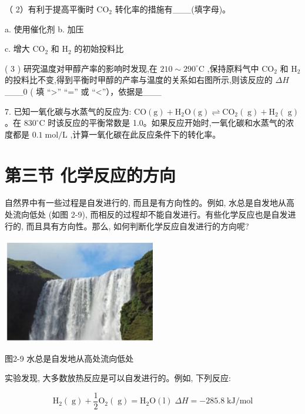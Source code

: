 \documentclass[10pt]{article}
\begin{document}
（ 2）有利于提高平衡时 \({\mathrm{{CO}}}_{2}\) 转化率的措施有\_\_\_(填字母)。

a. 使用催化剂 b. 加压

c. 增大 \({\mathrm{{CO}}}_{2}\) 和 \({\mathrm{H}}_{2}\) 的初始投料比

( 3 ) 研究温度对甲醇产率的影响时发现,在 \({210} \sim {290}^{ \circ }\mathrm{C}\) ,保持原料气中 \({\mathrm{{CO}}}_{2}\) 和 \({\mathrm{H}}_{2}\) 的投料比不变,得到平衡时甲醇的产率与温度的关系如右图所示,则该反应的 \({\Delta H}\) \_\_\_0 ( 填 “>” “=” 或 “<”），依据是\_\_\_

7. 已知一氧化碳与水蒸气的反应为: \(\mathrm{{CO}}\left( \mathrm{g}\right) + {\mathrm{H}}_{2}\mathrm{O}\left( \mathrm{g}\right) \rightleftharpoons {\mathrm{{CO}}}_{2}\left( \mathrm{\;g}\right) + {\mathrm{H}}_{2}\left( \mathrm{\;g}\right)\) 。在 \({830}^{ \circ }\mathrm{C}\) 时该反应的平衡常数是 1.0。如果反应开始时,一氧化碳和水蒸气的浓度都是 \({0.1}\mathrm{\;{mol}}/\mathrm{L}\) ,计算一氧化碳在此反应条件下的转化率。

\section*{第三节 化学反应的方向}

自然界中有一些过程是自发进行的, 而且是有方向性的。例如, 水总是自发地从高处流向低处 (如图 2-9), 而相反的过程却不能自发进行。有些化学反应也是自发进行的, 而且具有方向性。那么, 如何判断化学反应自发进行的方向呢?

\begin{center}
\includegraphics[max width=0.5\textwidth]{images/0190da9d-8bfd-732f-bc2c-0b21d0f13b91_48_258891.jpg}
\end{center}

图2-9 水总是自发地从高处流向低处

实验发现, 大多数放热反应是可以自发进行的。例如, 下列反应:

\[
{\mathrm{H}}_{2}\left( \mathrm{\;g}\right) + \frac{1}{2}{\mathrm{O}}_{2}\left( \mathrm{\;g}\right) = {\mathrm{H}}_{2}\mathrm{O}\left( \mathrm{l}\right) \;{\Delta H} = - {285.8}\mathrm{\;{kJ}}/\mathrm{{mol}}
\]
\end{document}
